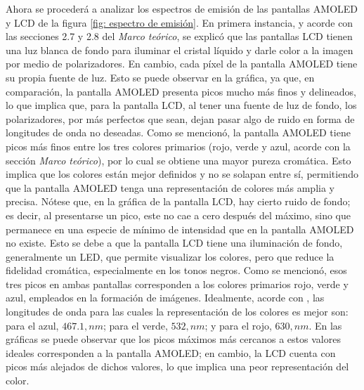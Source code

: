 \documentclass[twocolumn]{article}
\begin{document}
Ahora se procederá a analizar los espectros de emisión de las pantallas AMOLED y LCD de la figura \ref{fig: espectro de emisión}. En primera instancia, y acorde con las secciones 2.7 y 2.8 del \textit{Marco teórico}, se explicó que las pantallas LCD tienen una luz blanca de fondo para iluminar el cristal líquido y darle color a la imagen por medio de polarizadores. En cambio, cada píxel de la pantalla AMOLED tiene su propia fuente de luz. Esto se puede observar en la gráfica, ya que, en comparación, la pantalla AMOLED presenta picos mucho más finos y delineados, lo que implica que, para la pantalla LCD, al tener una fuente de luz de fondo, los polarizadores, por más perfectos que sean, dejan pasar algo de ruido en forma de longitudes de onda no deseadas. Como se mencionó, la pantalla AMOLED tiene picos más finos entre los tres colores primarios (rojo, verde y azul, acorde con la sección \textit{Marco teórico}), por lo cual se obtiene una mayor pureza cromática. Esto implica que los colores están mejor definidos y no se solapan entre sí, permitiendo que la pantalla AMOLED tenga una representación de colores más amplia y precisa. Nótese que, en la gráfica de la pantalla LCD, hay cierto ruido de fondo; es decir, al presentarse un pico, este no cae a cero después del máximo, sino que permanece en una especie de mínimo de intensidad que en la pantalla AMOLED no existe. Esto se debe a que la pantalla LCD tiene una iluminación de fondo, generalmente un LED, que permite visualizar los colores, pero que reduce la fidelidad cromática, especialmente en los tonos negros. Como se mencionó, esos tres picos en ambas pantallas corresponden a los colores primarios rojo, verde y azul, empleados en la formación de imágenes. Idealmente, acorde con \cite{Masaoka2014}, las longitudes de onda para las cuales la representación de los colores es mejor son: para el azul, $467.1,nm$; para el verde, $532,nm$; y para el rojo, $630,nm$. En las gráficas se puede observar que los picos máximos más cercanos a estos valores ideales corresponden a la pantalla AMOLED; en cambio, la LCD cuenta con picos más alejados de dichos valores, lo que implica una peor representación del color.
\end{document}
